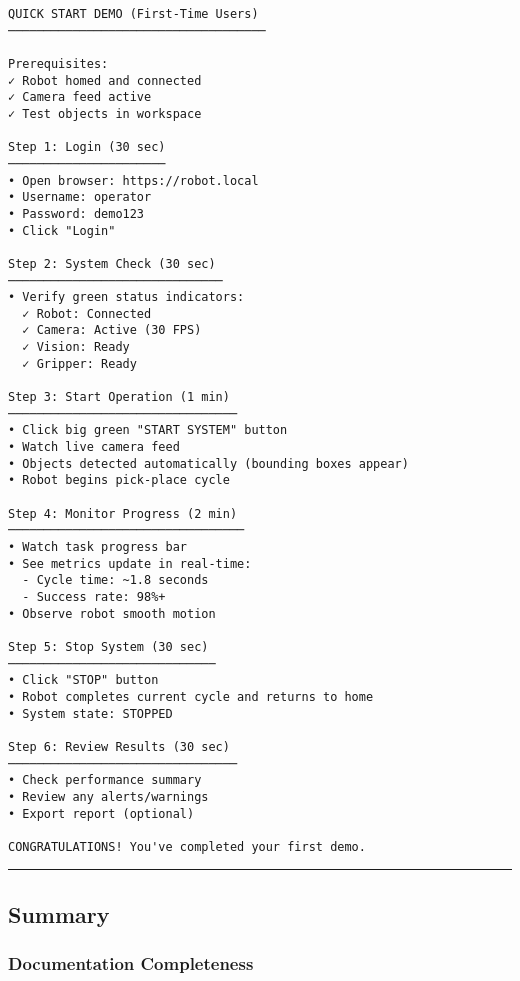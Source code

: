 \documentclass[
]{article}
\begin{document}
\begin{verbatim}
QUICK START DEMO (First-Time Users)
────────────────────────────────────

Prerequisites:
✓ Robot homed and connected
✓ Camera feed active
✓ Test objects in workspace

Step 1: Login (30 sec)
──────────────────────
• Open browser: https://robot.local
• Username: operator
• Password: demo123
• Click "Login"

Step 2: System Check (30 sec)
──────────────────────────────
• Verify green status indicators:
  ✓ Robot: Connected
  ✓ Camera: Active (30 FPS)
  ✓ Vision: Ready
  ✓ Gripper: Ready

Step 3: Start Operation (1 min)
────────────────────────────────
• Click big green "START SYSTEM" button
• Watch live camera feed
• Objects detected automatically (bounding boxes appear)
• Robot begins pick-place cycle

Step 4: Monitor Progress (2 min)
─────────────────────────────────
• Watch task progress bar
• See metrics update in real-time:
  - Cycle time: ~1.8 seconds
  - Success rate: 98%+
• Observe robot smooth motion

Step 5: Stop System (30 sec)
─────────────────────────────
• Click "STOP" button
• Robot completes current cycle and returns to home
• System state: STOPPED

Step 6: Review Results (30 sec)
────────────────────────────────
• Check performance summary
• Review any alerts/warnings
• Export report (optional)

CONGRATULATIONS! You've completed your first demo.
\end{verbatim}

\begin{center}\rule{0.5\linewidth}{0.5pt}\end{center}

\hypertarget{summary}{%
\subsection{Summary}\label{summary}}

\hypertarget{documentation-completeness}{%
\subsubsection{Documentation
Completeness}\label{documentation-completeness}}
\end{document}
